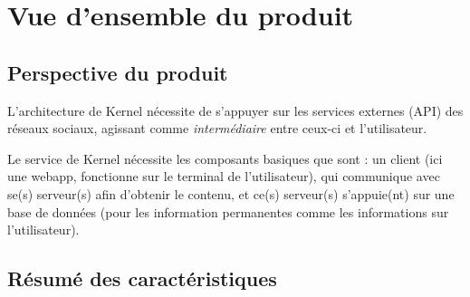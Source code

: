 \documentclass[11pt]{article}
\begin{document}
\newpage
\section{Vue d'ensemble du produit}


\subsection{Perspective du produit}


L'architecture de Kernel nécessite de s'appuyer sur les services externes (API) des réseaux sociaux, agissant comme \textit{intermédiaire} entre ceux-ci et l'utilisateur.

Le service de Kernel nécessite les composants basiques que sont : un client (ici une webapp, fonctionne sur le terminal de l'utilisateur), qui communique avec se(s) serveur(s) afin d'obtenir le contenu, et ce(s) serveur(s)  s'appuie(nt) sur une base de données (pour les information permanentes comme les informations sur l'utilisateur).

\vspace{4mm}
\begin{center}
\end{center}

\subsection{Résumé des caractéristiques}
\end{document}
